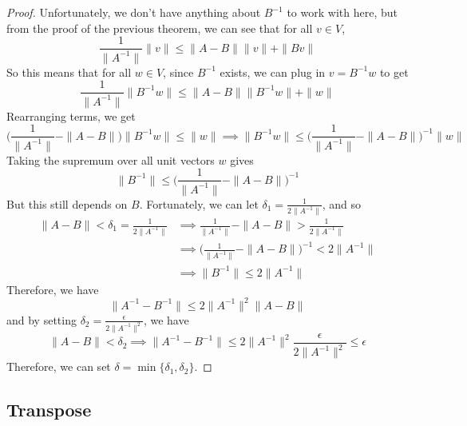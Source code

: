 \begin{proof}
		Unfortunately, we don't have anything about $B^{-1}$ to work with here, but from the proof of the previous theorem, we can see that for all $v \in V$, 
		\begin{equation}
			\frac{1}{\|A^{-1}\|} \|v\| \leq \|A - B\| \|v\| + \|Bv\|
		\end{equation}
		So this means that for all $w \in V$, since $B^{-1}$ exists, we can plug in $v = B^{-1} w$ to get 
		\begin{equation}
			\frac{1}{\|A^{-1}\|} \|B^{-1}w\| \leq \|A - B\| \|B^{-1} w\| + \|w\| 
		\end{equation} 
		Rearranging terms, we get 
		\begin{equation}
			\bigg( \frac{1}{\|A^{-1}\|} - \|A - B\|\bigg) \|B^{-1} w\| \leq \|w\| \implies \|B^{-1} w\| \leq \bigg( \frac{1}{\|A^{-1}\|} - \|A - B\|\bigg)^{-1} \|w\| 
		\end{equation}
		Taking the supremum over all unit vectors $w$ gives 
		\begin{equation}
			\|B^{-1}\| \leq \bigg( \frac{1}{\|A^{-1}\|} - \|A - B\|\bigg)^{-1}
		\end{equation} 
		But this still depends on $B$. Fortunately, we can let $\delta_1 = \frac{1}{2 \|A^{-1}\|}$, and so 
		\begin{align}
			\|A - B\| < \delta_1 = \frac{1}{2 \|A^{-1}\|}
				& \implies \frac{1}{\|A^{-1}\|} - \|A - B\| > \frac{1}{2 \|A^{-1}\|} \\ 
				& \implies \bigg( \frac{1}{\|A^{-1}\|} - \|A - B\| \bigg)^{-1} < 2 \|A^{-1}\| \\ 
				& \implies \|B^{-1}\| \leq 2 \|A^{-1}\|
		\end{align}
		Therefore, we have 
		\begin{equation}
			\|A^{-1} - B^{-1}\| \leq 2\|A^{-1}\|^2 \|A - B\|
		\end{equation}
		and by setting $\delta_2 = \frac{\epsilon}{2 \|A^{-1}\|^2}$, we have 
		\begin{equation}
			\|A - B\| < \delta_2 \implies \|A^{-1} - B^{-1}\| \leq 2 \|A^{-1}\|^2 \frac{\epsilon}{2 \|A^{-1}\|^2} \leq \epsilon
		\end{equation}
		Therefore, we can set $\delta = \min\{\delta_1, \delta_2\}$. 
	\end{proof}

\subsection{Transpose}

